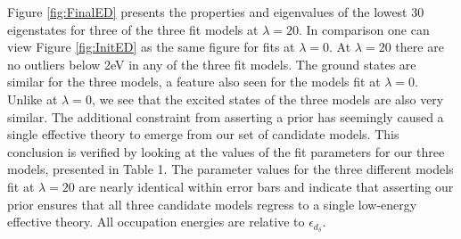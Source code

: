 \documentclass{article}
\begin{document}
Figure \ref{fig:FinalED} presents the properties and eigenvalues of the lowest 30 eigenstates for three of the three fit models at $\lambda = 20$. 
In comparison one can view Figure \ref{fig:InitED} as the same figure for fits at $\lambda = 0$. 
At $\lambda = 20$ there are no outliers below 2eV in any of the three fit models. 
The ground states are similar for the three models, a feature also seen for the models fit at $\lambda = 0$.
Unlike at $\lambda = 0$, we see that the excited states of the three models are also very similar.
The additional constraint from asserting a prior has seemingly caused a single effective theory to emerge from our set of candidate models.
This conclusion is verified by looking at the values of the fit parameters for our three models, presented in Table 1.
The parameter values for the three different models fit at $\lambda = 20$ are nearly identical within error bars and indicate that asserting our prior ensures that all three candidate models regress to a single low-energy effective theory.
All occupation energies are relative to $\epsilon_{d_\delta}$.
\end{document}
